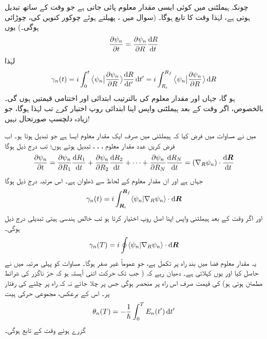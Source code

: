  چونکہ ہیملٹنی میں کوئی ایسی مقدار معلوم  پائی جاتی ہے جو وقت کے ساتھ تبدیل ہوتی ہے، لہٰذا  وقت  کا تابع ہوگا۔ (سوال  میں ، پھیلتے ہوئے چوکور کنویں کی، چوڑائی ہوگی۔) یوں
\begin{align}\label{مساوات_حر_ایک_مقدار_معلوم}
\frac{\partial \psi_n}{\partial t} = \frac{\partial \psi_n}{\partial R} \frac{\dif R}{\dif t}
\end{align}
لہٰذا 
\begin{align}\label{مساوات_حر_ہندسی_ہیّت_فرق}
\gamma_n (t) = i \int_0^t \big\langle \psi_n \big| \frac{\partial \psi_n}{\partial R} \big\rangle \frac{\dif R}{\dif t'} \dif t' = i \int_{R_i}^{R_f} \big\langle \psi_n \big | \frac{\partial \psi_n}{\partial R}\big \rangle \dif R 
\end{align}
ہو گا، جہاں  اور  مقدار معلوم  کی بالترتیب ابتدائی اور اختتامی قیمتیں ہوں گی۔ بالخصوص، اگر وقت  کے بعد ہیملٹنی واپس اپنا ابتدائی روپ اختیار کرے تب  لہٰذا  ہوگا، جو زیادہ دلچسپ صورتحال نہیں!

 میں نے مساوات  میں فرض کیا کہ ہیملٹنی میں صرف ایک مقدار معلوم ایسا ہے جو تبدیل ہوتا ہو۔ اب فرض کریں  عدد مقدار معلوم ، ، ،  تبدیل ہوتے ہوں؛ تب درج ذیل ہوگا 
\begin{align}
\frac{\partial \psi_n}{\partial t} = \frac{\partial \psi_n}{\partial R_1} \frac{\dif R_1}{\dif t} + \frac{\partial \psi_n}{\partial R_2} \frac{\dif R_2}{\dif t} + \cdots + \frac{\partial \psi_n}{\partial R_N} \frac{\dif R_N}{\dif t} = (\nabla_R \psi_n) \cdot \frac{\dif \kvec{R}}{\dif t}
\end{align} 
جہاں  ہے اور  ان مقدار معلوم کے لحاظ سے ڈھلوان ہے۔ اس مرتبہ درج ذیل ہوگا 
\begin{align}
\gamma_n (t) = i \int_{\kvec{R}_i}^{\kvec{R}_f} \langle \psi_n | \nabla_R \psi_n \rangle \cdot \dif \kvec{R}
\end{align}
اور اگر وقت  کے بعد ہیملٹنی واپس اپنا اصل روپ اختیار کرتا ہو تب خالص ہندسی ہیتی تبدیلی درج ذیل ہوگی۔
\begin{align}\label{مساوات_حر_غیر_صفر_لکیری_تکمل}
\gamma_n (T) = i \oint \langle \psi_n | \nabla_R \psi_n \rangle \cdot \dif \kvec{R}
\end{align}
یہ مقدار معلوم فضا میں بند راہ پر  تکمل ہے، جو عموماً غیر صفر ہوگا۔ مساوات  کو پہلی مرتبہ  میں  نے حاصل کیا اور یوں   کہلاتی ہے۔ دھیان رہے کہ ( جب تک حرکت اتنی آہستہ ہو کہ حرّ ناگزر کی شرائط مطمئن ہوتی ہو)  کی قیمت صرف اس راہ پر منحصر ہوگی جس پر چلا جائے نہ کہ راہ پر چلنے کی رفتار پر۔ اس کے برعکس، مجموعی حرکی ہیت 
\begin{align*}
\theta_n (T) = - \frac{1}{\hslash} \int_0^T E_n (t') \dif t'
\end{align*}
گزرے ہوئے وقت کے تابع ہوگی۔

